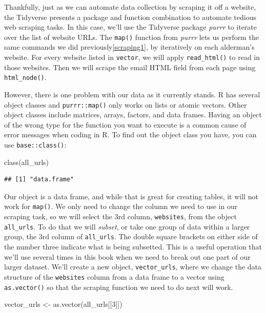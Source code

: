 \documentclass[
  krantz2]{krantz}
\makeatletter
\newenvironment{Shaded}{\begin{snugshade}}{\end{snugshade}}
\newcommand{\DecValTok}[1]{\textcolor[rgb]{0.06,0.06,0.06}{#1}}
\newcommand{\FunctionTok}[1]{\textcolor[rgb]{0,0,0}{#1}}
\newcommand{\NormalTok}[1]{#1}
\newcommand{\OtherTok}[1]{\textcolor[rgb]{0.37,0.37,0.37}{#1}}
\newenvironment{kframe}{%
\medskip{}
\setlength{\fboxsep}{.8em}
 \def\at@end@of@kframe{}%
 \ifinner\ifhmode%
  \def\at@end@of@kframe{\end{minipage}}%
  \begin{minipage}{\columnwidth}%
 \fi\fi%
 \def\FrameCommand##1{\hskip\@totalleftmargin \hskip-\fboxsep
 \colorbox{shadecolor}{##1}\hskip-\fboxsep
     \hskip-\linewidth \hskip-\@totalleftmargin \hskip\columnwidth}%
 \MakeFramed {\advance\hsize-\width
   \@totalleftmargin\z@ \linewidth\hsize
   \@setminipage}}%
 {\par\unskip\endMakeFramed%
 \at@end@of@kframe}
\renewenvironment{Shaded}{\begin{kframe}}{\end{kframe}}
\makeatother
\begin{document}
Thankfully, just as we can automate data collection by scraping it off a website, the Tidyverse presents a package and function combination to automate tedious web scraping tasks. In this case, we'll use the Tidyverse package \emph{purrr} to iterate over the list of website URLs. The \texttt{map()} function from \emph{purrr} lets us perform the same commands we did previously\ref{scraping1}, by iteratively on each alderman's website. For every website listed in \texttt{vector}, we will apply \texttt{read\_html()} to read in those websites. Then we will scrape the email HTML field from each page using \texttt{html\_node()}.

However, there is one problem with our data as it currently stands. R has several object classes and \texttt{purrr::map()} only works on lists or atomic vectors. Other object classes include matrices, arrays, factors, and data frames. Having an object of the wrong type for the function you want to execute is a common cause of error messages when coding in R. To find out the object class you have, you can use \texttt{base::class()}:

\begin{Shaded}
\begin{Highlighting}[]
\FunctionTok{class}\NormalTok{(all\_urls)}
\end{Highlighting}
\end{Shaded}

\begin{verbatim}
## [1] "data.frame"
\end{verbatim}

Our object is a data frame, and while that is great for creating tables, it will not work for \texttt{map()}. We only need to change the column we need to use in our scraping task, so we will select the 3rd column, \texttt{websites}, from the object \texttt{all\_urls}. To do that we will \emph{subset}, or take one group of data within a larger group, the 3rd column of \texttt{all\_urls}. The double square brackets on either side of the number three indicate what is being subsetted. This is a useful operation that we'll use several times in this book when we need to break out one part of our larger dataset. We'll create a new object, \texttt{vector\_urls}, where we change the data structure of the \texttt{websites} column from a data frame to a vector using \texttt{as.vector()} so that the scraping function we need to do next will work.

\begin{Shaded}
\begin{Highlighting}[]
\NormalTok{vector\_urls }\OtherTok{\textless{}{-}} \FunctionTok{as.vector}\NormalTok{(all\_urls[[}\DecValTok{3}\NormalTok{]])}
\end{Highlighting}
\end{Shaded}
\end{document}
